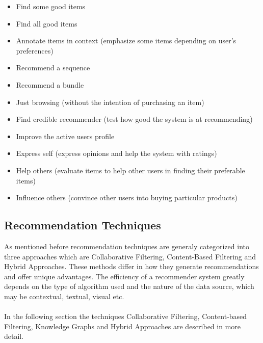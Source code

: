 \documentclass[\myFontSize,oneside,english,hidelinks,a4paper]{article}
\begin{document}
\begin{itemize}[label=--]
\item Find some good items
\item Find all good items
\item Annotate items in context (emphasize some items depending on user's preferences)
\item Recommend a sequence
\item Recommend a bundle
\item Just browsing (without the intention of purchasing an item)
\item Find credible recommender (test how good the system is at recommending)
\item Improve the active users profile
\item Express self (express opinions and help the system with ratings)
\item Help others (evaluate items to help other users in finding their preferable items)
\item Influence others (convince other users into buying particular products)
\end{itemize}

\clearpage

\subsection{Recommendation Techniques}
As mentioned before recommendation techniques are generaly categorized into three approaches which are Collaborative Filtering, Content-Based Filtering and Hybrid Approaches. These methods differ in how they generate recommendations and offer unique advantages. The efficiency of a recommender system greatly depends on the type of algorithm used and the nature of the data source, which may be contextual, textual, visual etc. \cite{Roy2022}\\\\
In the following section the techniques Collaborative Filtering, Content-based Filtering, Knowledge Graphs and Hybrid Approaches are described in more detail.\\
%
\end{document}
